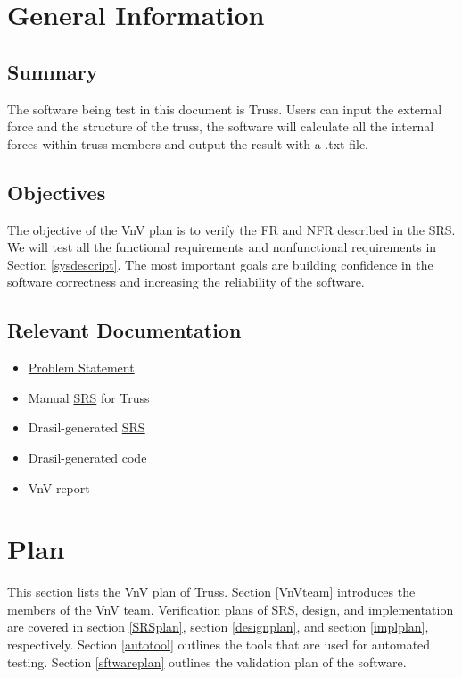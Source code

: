 \documentclass[12pt, titlepage]{article}
\begin{document}
\section{General Information} \label{Geninf}

\subsection{Summary}

The software being test in this document is Truss. Users can input the external 
force and the structure of the truss, the software will calculate all the 
internal forces within truss members and output the result with a .txt file. 


\subsection{Objectives}
The objective of the VnV plan is to verify the FR and NFR described in the SRS. 
We will test all the functional requirements and nonfunctional requirements in 
Section \ref{sysdescript}. The most important goals are building confidence 
in the software correctness and increasing the reliability of the software. 

\subsection{Relevant Documentation}

\begin{itemize}
	\item 
	\href{https://github.com/tingyuw/cas741/blob/master/docs/ProblemStatement/ProblemStatement.pdf}{Problem
	 Statement}
	\item Manual
	\href{https://github.com/tingyuw/cas741/blob/master/docs/SRS/SRS.pdf}{SRS} 
	for Truss
	\item Drasil-generated 
	\href{https://github.com/tingyuw/cas741/tree/master/docs/Drasil}{SRS}
	\item Drasil-generated code
	\item VnV report
\end{itemize}


\section{Plan} \label{verplan}
This section lists the VnV plan of Truss. Section \ref{VnVteam} introduces the 
members of the VnV team. Verification plans of SRS, design, and implementation 
are covered in section \ref{SRSplan}, section \ref{designplan}, and section 
\ref{implplan}, respectively. Section \ref{autotool} outlines the tools that 
are used for automated testing. Section \ref{sftwareplan} outlines the 
validation plan of the software.
\end{document}
